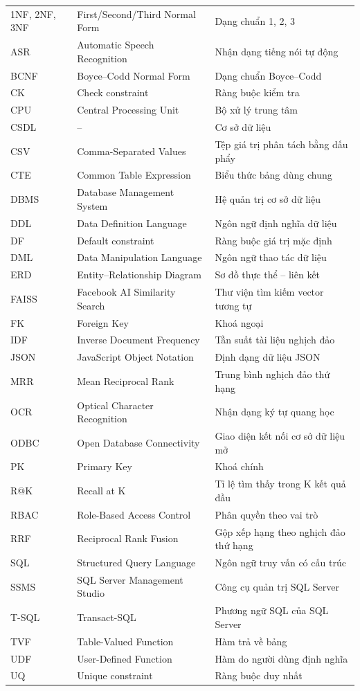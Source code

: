 \begin{longtable}{
    >{\raggedright\arraybackslash}p{}
    >{\raggedright\arraybackslash}p{}
    >{\raggedright\arraybackslash}p{}
}
1NF, 2NF, 3NF & First/Second/Third Normal Form & Dạng chuẩn 1, 2, 3 \\
ASR & Automatic Speech Recognition & Nhận dạng tiếng nói tự động \\
BCNF & Boyce--Codd Normal Form & Dạng chuẩn Boyce--Codd \\
CK & Check constraint & Ràng buộc kiểm tra \\
CPU & Central Processing Unit & Bộ xử lý trung tâm \\
CSDL & -- & Cơ sở dữ liệu \\
CSV & Comma-Separated Values & Tệp giá trị phân tách bằng dấu phẩy \\
CTE & Common Table Expression & Biểu thức bảng dùng chung \\
DBMS & Database Management System & Hệ quản trị cơ sở dữ liệu \\
DDL & Data Definition Language & Ngôn ngữ định nghĩa dữ liệu \\
DF & Default constraint & Ràng buộc giá trị mặc định \\
DML & Data Manipulation Language & Ngôn ngữ thao tác dữ liệu \\
ERD & Entity--Relationship Diagram & Sơ đồ thực thể -- liên kết \\
FAISS & Facebook AI Similarity Search & Thư viện tìm kiếm vector tương tự \\
FK & Foreign Key & Khoá ngoại \\
IDF & Inverse Document Frequency & Tần suất tài liệu nghịch đảo \\
JSON & JavaScript Object Notation & Định dạng dữ liệu JSON \\
MRR & Mean Reciprocal Rank & Trung bình nghịch đảo thứ hạng \\
OCR & Optical Character Recognition & Nhận dạng ký tự quang học \\
ODBC & Open Database Connectivity & Giao diện kết nối cơ sở dữ liệu mở \\
PK & Primary Key & Khoá chính \\
R@K & Recall at K & Tỉ lệ tìm thấy trong K kết quả đầu \\
RBAC & Role-Based Access Control & Phân quyền theo vai trò \\
RRF & Reciprocal Rank Fusion & Gộp xếp hạng theo nghịch đảo thứ hạng \\
SQL & Structured Query Language & Ngôn ngữ truy vấn có cấu trúc \\
SSMS & SQL Server Management Studio & Công cụ quản trị SQL Server \\
T-SQL & Transact-SQL & Phương ngữ SQL của SQL Server \\
TVF & Table-Valued Function & Hàm trả về bảng \\
UDF & User-Defined Function & Hàm do người dùng định nghĩa \\
UQ & Unique constraint & Ràng buộc duy nhất \\
\end{longtable}
